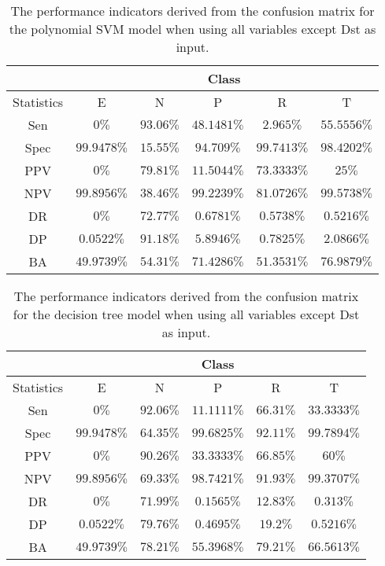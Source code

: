 \begin{table}[!ht]
	\centering
	\begin{tabular}{|c|c|c|c|c|c|}
		\hline
		 & \multicolumn{5}{c|}{Class} \\ \hline
		Statistics & E & N & P & R & T \\ \hline
		Sen & $0\%$ & $93.06\%$ & $48.1481\%$ & $2.965\%$ & $55.5556\%$ \\ \hline
		Spec & $99.9478\%$ & $15.55\%$ & $94.709\%$ & $99.7413\%$ & $98.4202\%$ \\ \hline
		PPV & $0\%$ & $79.81\%$ & $11.5044\%$ & $73.3333\%$ & $25\%$ \\ \hline
		NPV & $99.8956\%$ & $38.46\%$ & $99.2239\%$ & $81.0726\%$ & $99.5738\%$ \\ \hline
		DR & $0\%$ & $72.77\%$ & $0.6781\%$ & $0.5738\%$ & $0.5216\%$ \\ \hline
		DP & $0.0522\%$ & $91.18\%$ & $5.8946\%$ & $0.7825\%$ & $2.0866\%$ \\ \hline
		BA & $49.9739\%$ & $54.31\%$ & $71.4286\%$ & $51.3531\%$ & $76.9879\%$ \\ \hline
	\end{tabular}
	\caption{The performance indicators derived from the confusion matrix for the polynomial SVM model when using all variables except Dst as input.}
	\label{tab:cs:reverse:noDst:svmPoly}
\end{table}

\begin{table}[!ht]
	\centering
	\begin{tabular}{|c|c|c|c|c|c|}
		\hline
		 & \multicolumn{5}{c|}{Class} \\ \hline
		Statistics & E & N & P & R & T \\ \hline
		Sen & $0\%$ & $92.06\%$ & $11.1111\%$ & $66.31\%$ & $33.3333\%$ \\ \hline
		Spec & $99.9478\%$ & $64.35\%$ & $99.6825\%$ & $92.11\%$ & $99.7894\%$ \\ \hline
		PPV & $0\%$ & $90.26\%$ & $33.3333\%$ & $66.85\%$ & $60\%$ \\ \hline
		NPV & $99.8956\%$ & $69.33\%$ & $98.7421\%$ & $91.93\%$ & $99.3707\%$ \\ \hline
		DR & $0\%$ & $71.99\%$ & $0.1565\%$ & $12.83\%$ & $0.313\%$ \\ \hline
		DP & $0.0522\%$ & $79.76\%$ & $0.4695\%$ & $19.2\%$ & $0.5216\%$ \\ \hline
		BA & $49.9739\%$ & $78.21\%$ & $55.3968\%$ & $79.21\%$ & $66.5613\%$ \\ \hline
	\end{tabular}
	\caption{The performance indicators derived from the confusion matrix for the decision tree model when using all variables except Dst as input.}
	\label{tab:cs:reverse:noDst:C5.0}
\end{table}

